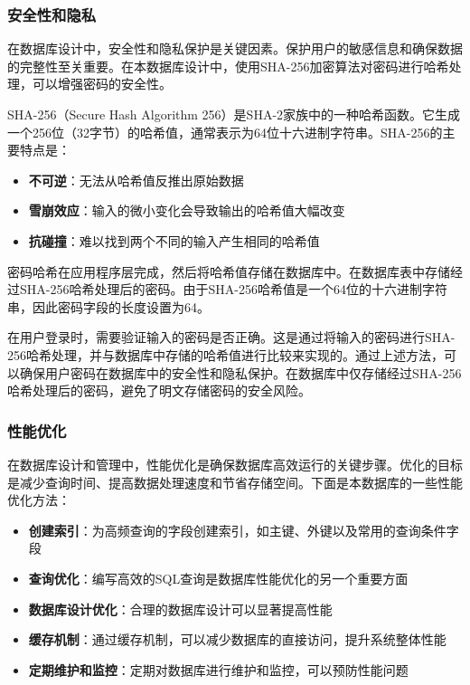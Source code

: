 \subsubsection{安全性和隐私}

在数据库设计中，安全性和隐私保护是关键因素。保护用户的敏感信息和确保数据的完整性至关重要。在本数据库设计中，使用SHA-256加密算法对密码进行哈希处理，可以增强密码的安全性。

SHA-256（Secure Hash Algorithm 256）是SHA-2家族中的一种哈希函数。它生成一个256位（32字节）的哈希值，通常表示为64位十六进制字符串。SHA-256的主要特点是：

\begin{itemize}
    \item \textbf{不可逆}：无法从哈希值反推出原始数据
    \item \textbf{雪崩效应}：输入的微小变化会导致输出的哈希值大幅改变
    \item \textbf{抗碰撞}：难以找到两个不同的输入产生相同的哈希值
\end{itemize}

密码哈希在应用程序层完成，然后将哈希值存储在数据库中。在数据库表中存储经过SHA-256哈希处理后的密码。由于SHA-256哈希值是一个64位的十六进制字符串，因此密码字段的长度设置为64。

在用户登录时，需要验证输入的密码是否正确。这是通过将输入的密码进行SHA-256哈希处理，并与数据库中存储的哈希值进行比较来实现的。通过上述方法，可以确保用户密码在数据库中的安全性和隐私保护。在数据库中仅存储经过SHA-256哈希处理后的密码，避免了明文存储密码的安全风险。

\subsubsection{性能优化}

在数据库设计和管理中，性能优化是确保数据库高效运行的关键步骤。优化的目标是减少查询时间、提高数据处理速度和节省存储空间。下面是本数据库的一些性能优化方法：

\begin{itemize}
    \item \textbf{创建索引}：为高频查询的字段创建索引，如主键、外键以及常用的查询条件字段
    \item \textbf{查询优化}：编写高效的SQL查询是数据库性能优化的另一个重要方面
    \item \textbf{数据库设计优化}：合理的数据库设计可以显著提高性能
    \item \textbf{缓存机制}：通过缓存机制，可以减少数据库的直接访问，提升系统整体性能
    \item \textbf{定期维护和监控}：定期对数据库进行维护和监控，可以预防性能问题
\end{itemize}

